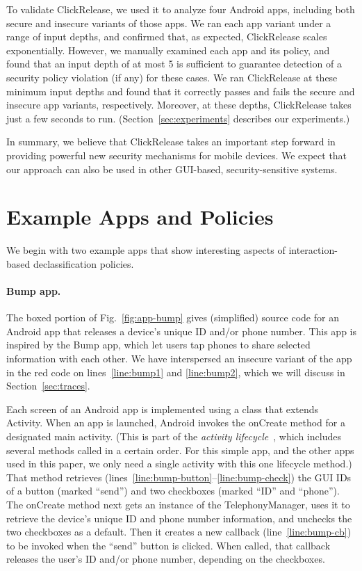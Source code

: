 \documentclass{llncs}
\newcommand{\code}[1]{\textsf{#1}} %
\newcommand{\toolname}{ClickRelease\xspace}
\begin{document}
To validate \toolname, we used it to analyze four Android apps,
including both secure and insecure variants of those apps.
We ran each app variant under a range of input depths, and confirmed
that, as expected, \toolname{} scales exponentially.
However, we manually examined each app and its policy, and
found that an input depth of at most 5 is sufficient to
guarantee detection of a security policy violation (if any) for these
cases.  We ran \toolname{} at these minimum input depths and found
that it correctly passes and fails the secure and insecure app
variants, respectively. Moreover, at these depths, \toolname{} takes just a few
seconds to run. (Section~\ref{sec:experiments} describes our experiments.)

In summary, we believe that \toolname takes an important step forward
in providing powerful new security mechanisms for mobile devices. We
expect that our approach can also be used in other
GUI-based, security-sensitive systems.

\section{Example Apps and Policies}
\label{sec:overview}

We begin with two example apps that show interesting aspects of
interaction-based declassification
policies.

\paragraph*{Bump app.}

The boxed portion of Fig.~\ref{fig:app-bump} gives (simplified) source
code for an Android app that releases a device's unique ID and/or phone
number. This app is inspired by the Bump app, which let users tap
phones to share selected information with each other.  We have
interspersed an insecure variant of the app in the red code on
lines~\ref{line:bump1} and \ref{line:bump2}, which we will
discuss in Section~\ref{sec:traces}.

Each screen of an Android app is implemented using a class that
extends \code{Activity}. When an app is launched, Android invokes the
\code{onCreate} method for a designated main activity.
(This is part of the \emph{activity lifecycle}~\cite{Android:15},
which includes several methods called in a certain order. For this
simple app, and the other apps used in this paper, we only need a
single activity with this one lifecycle method.)
That method retrieves
(lines~\ref{line:bump-button}--\ref{line:bump-check}) the GUI IDs of a
button (marked ``send'') and
two checkboxes (marked ``ID'' and ``phone''). The \code{onCreate} method next
gets an instance of the \code{TelephonyManager}, uses it
to retrieve the device's unique ID and phone number information, and unchecks the two
checkboxes as a default. Then it creates a new callback
(line~\ref{line:bump-cb}) to be invoked when the ``send'' button is
clicked. When called, that callback releases the user's ID and/or
phone number, depending on the checkboxes.
\end{document}
